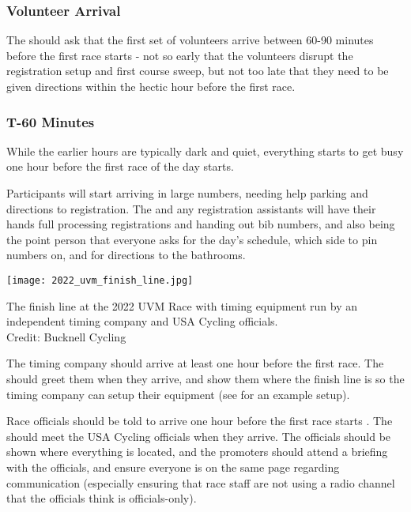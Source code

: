 \subsubsection{Volunteer Arrival}

The  should ask that the first set of volunteers arrive between 60-90 minutes before the first race starts -
not so early that the volunteers disrupt the registration setup and first course sweep, but not too late that they need to be given directions
within the hectic hour before the first race.

\subsubsection{T-60 Minutes}

While the earlier hours are typically dark and quiet, everything starts to get busy one hour before the first race of the day starts.

Participants will start arriving in large numbers, needing help parking and directions to registration.
The  and any registration assistants will have their hands full processing registrations and handing out bib numbers,
and also being the point person that everyone asks for the day's schedule, which side to pin numbers on, and for directions to the bathrooms.

\begin{marginfigure}
  \texttt{[image: 2022\_uvm\_finish\_line.jpg]}
  \caption[A finish line setup with equipment, timing company, and USA Cycling officials]{The finish line at the 2022 UVM Race with timing equipment run by an independent timing company and
            USA Cycling officials.\\
            Credit: Bucknell Cycling}
\end{marginfigure}

The timing company should arrive at least one hour before the first race.
The  should greet them when they arrive,
and show them where the finish line is so the timing company can setup their equipment (see  for an example setup).

Race officials should be told to arrive one hour before the first race starts%
.
The  should meet the USA Cycling officials when they arrive.
The officials should be shown where everything is located, and the promoters should attend a briefing with the officials,
and ensure everyone is on the same page regarding communication (especially ensuring that race staff are not using a radio channel that the officials think is officials-only).

